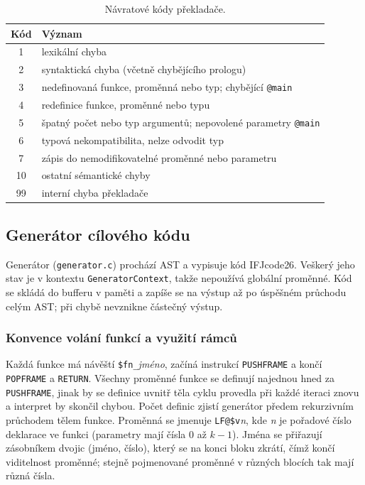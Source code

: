 \documentclass[11pt]{article}
\newcommand{\file}[1]{\texttt{#1}}                   %
\newcommand{\ic}[1]{\texttt{#1}}                     %
\begin{document}
\begin{table}[ht]
\centering
\begin{tabular}{@{}cl@{}}
  \toprule
  Kód & Význam \\
  \midrule
  1 & lexikální chyba \\
  2 & syntaktická chyba (včetně chybějícího prologu) \\
  3 & nedefinovaná funkce, proměnná nebo typ; chybějící \ic{@main} \\
  4 & redefinice funkce, proměnné nebo typu \\
  5 & špatný počet nebo typ argumentů; nepovolené parametry \ic{@main} \\
  6 & typová nekompatibilita, nelze odvodit typ \\
  7 & zápis do nemodifikovatelné proměnné nebo parametru \\
  10 & ostatní sémantické chyby \\
  99 & interní chyba překladače \\
  \bottomrule
\end{tabular}
\caption{Návratové kódy překladače.}
\label{tab:errors}
\end{table}

\subsection{Generátor cílového kódu}

Generátor (\file{generator.c}) prochází AST a vypisuje kód IFJcode26. Veškerý jeho stav je v kontextu \texttt{GeneratorContext}, takže nepoužívá globální proměnné. Kód se skládá do bufferu v paměti a zapíše se na výstup až po úspěšném průchodu celým AST; při chybě nevznikne částečný výstup.

\subsubsection{Konvence volání funkcí a využití rámců}
\label{sec:konvence_volani}

Každá funkce má návěští \ic{\$fn\_}\textit{jméno}, začíná instrukcí \ic{PUSHFRAME} a končí \ic{POPFRAME} a \ic{RETURN}. Všechny proměnné funkce se definují najednou hned za \ic{PUSHFRAME}, jinak by se definice uvnitř těla cyklu provedla při každé iteraci znovu a interpret by skončil chybou. Počet definic zjistí generátor předem rekurzivním průchodem tělem funkce. Proměnná se jmenuje \ic{LF@\$v}\textit{n}, kde \textit{n} je pořadové číslo deklarace ve funkci (parametry mají čísla $0$ až $k-1$). Jména se přiřazují zásobníkem dvojic (jméno, číslo), který se na konci bloku zkrátí, čímž končí viditelnost proměnné; stejně pojmenované proměnné v různých blocích tak mají různá čísla.
\end{document}
